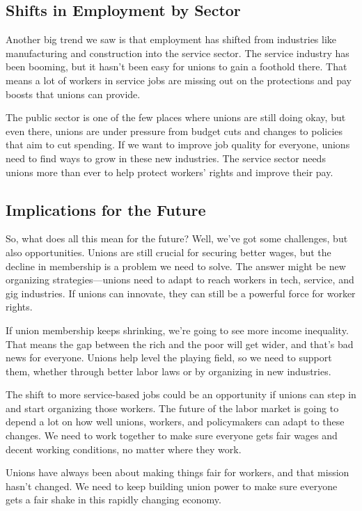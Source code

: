\documentclass[
]{book}
\theoremstyle{definition}
\theoremstyle{definition}
\theoremstyle{definition}
\theoremstyle{definition}
\theoremstyle{remark}
\begin{document}
\subsection{Shifts in Employment by Sector}\label{shifts-in-employment-by-sector}

Another big trend we saw is that employment has shifted from industries like manufacturing and construction into the service sector. The service industry has been booming, but it hasn't been easy for unions to gain a foothold there. That means a lot of workers in service jobs are missing out on the protections and pay boosts that unions can provide.

The public sector is one of the few places where unions are still doing okay, but even there, unions are under pressure from budget cuts and changes to policies that aim to cut spending. If we want to improve job quality for everyone, unions need to find ways to grow in these new industries. The service sector needs unions more than ever to help protect workers' rights and improve their pay.

\subsection{Implications for the Future}\label{implications-for-the-future}

So, what does all this mean for the future? Well, we've got some challenges, but also opportunities. Unions are still crucial for securing better wages, but the decline in membership is a problem we need to solve. The answer might be new organizing strategies---unions need to adapt to reach workers in tech, service, and gig industries. If unions can innovate, they can still be a powerful force for worker rights.

If union membership keeps shrinking, we're going to see more income inequality. That means the gap between the rich and the poor will get wider, and that's bad news for everyone. Unions help level the playing field, so we need to support them, whether through better labor laws or by organizing in new industries.

The shift to more service-based jobs could be an opportunity if unions can step in and start organizing those workers. The future of the labor market is going to depend a lot on how well unions, workers, and policymakers can adapt to these changes. We need to work together to make sure everyone gets fair wages and decent working conditions, no matter where they work.

Unions have always been about making things fair for workers, and that mission hasn't changed. We need to keep building union power to make sure everyone gets a fair shake in this rapidly changing economy.

  
\end{document}
